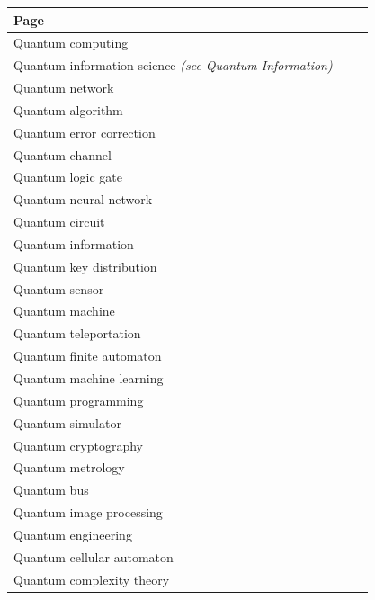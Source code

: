 \documentclass[11pt,oneside]{book}
\begin{document}
\begin{longtable}{p{0.92\linewidth}}
\toprule
Page \\
\midrule
\endhead
{}\label{page:quantum-computing}Quantum computing \\
\label{page:quantum-information-science}Quantum information science \emph{(see Quantum Information)} \\
\label{page:quantum-network}Quantum network \\
\label{page:quantum-algorithm}Quantum algorithm \\
\label{page:quantum-error-correction}Quantum error correction \\
\label{page:quantum-channel}Quantum channel \\
\label{page:quantum-logic-gate}Quantum logic gate \\
\label{page:quantum-neural-network}Quantum neural network \\
\label{page:quantum-circuit}Quantum circuit \\
\label{page:quantum-information}Quantum information \\
\label{page:quantum-key-distribution}Quantum key distribution \\
\label{page:quantum-sensor}Quantum sensor \\
\label{page:quantum-machine}Quantum machine \\
\label{page:quantum-teleportation}Quantum teleportation \\
\label{page:quantum-finite-automaton}Quantum finite automaton \\
\label{page:quantum-machine-learning}Quantum machine learning \\
\label{page:quantum-programming}Quantum programming \\
\label{page:quantum-simulator}Quantum simulator \\
\label{page:quantum-cryptography}Quantum cryptography \\
\label{page:quantum-metrology}Quantum metrology \\
\label{page:quantum-bus}Quantum bus \\
\label{page:quantum-image-processing}Quantum image processing \\
\label{page:quantum-engineering}Quantum engineering \\
\label{page:quantum-cellular-automaton}Quantum cellular automaton \\
\label{page:quantum-complexity-theory}Quantum complexity theory \\
\bottomrule
\end{longtable}
\end{document}
